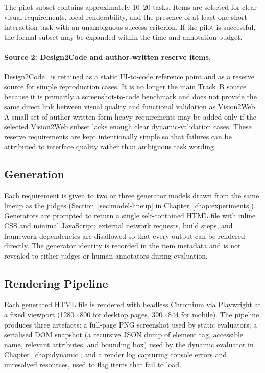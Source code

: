 The pilot subset contains approximately 10--20 tasks. Items are selected
for clear visual requirements, local renderability, and the presence of
at least one short interaction task with an unambiguous success
criterion. If the pilot is successful, the formal subset may be expanded
within the time and annotation budget.

\paragraph{Source 2: Design2Code and author-written reserve items.}
Design2Code~\cite{design2code} is retained as a static UI-to-code
reference point and as a reserve source for simple reproduction cases.
It is no longer the main Track~B source because it is primarily a
screenshot-to-code benchmark and does not provide the same direct link
between visual quality and functional validation as Vision2Web. A small
set of author-written form-heavy requirements may be added only if the
selected Vision2Web subset lacks enough clear dynamic-validation cases.
These reserve requirements are kept intentionally simple so that
failures can be attributed to interface quality rather than ambiguous
task wording.

\subsection{Generation}

Each requirement is given to two or three generator models drawn from
the same lineup as the judges (Section~\ref{sec:model-lineup} in
Chapter~\ref{chap:experiments}). Generators are prompted to return a
single self-contained HTML file with inline CSS and minimal JavaScript;
external network requests, build steps, and framework dependencies are
disallowed so that every output can be rendered directly. The generator
identity is recorded in the item metadata and is not revealed to either
judges or human annotators during evaluation.

\subsection{Rendering Pipeline}

Each generated HTML file is rendered with headless Chromium via
Playwright at a fixed viewport (1280$\times$800 for desktop pages,
390$\times$844 for mobile). The pipeline produces three artefacts: a
full-page PNG screenshot used by static evaluators; a serialised DOM
snapshot (a recursive JSON dump of element tag, accessible name,
relevant attributes, and bounding box) used by the dynamic evaluator
in Chapter~\ref{chap:dynamic}; and a render log capturing console
errors and unresolved resources, used to flag items that fail to load.

